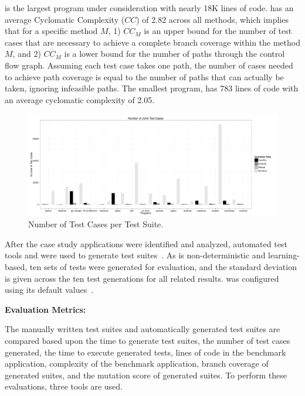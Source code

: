 \netweaver is the largest program under consideration with nearly 18K lines of code.  \netweaver has an average Cyclomatic Complexity ($CC$) of 2.82 across all methods, which implies that for a specific method $M$, 1) $CC_M$ is an upper bound for the number of test cases that are necessary to achieve a complete branch coverage within the method $M$, and 2) $CC_M$ is a lower bound for the number of paths through the control flow graph. Assuming each test case takes one path, the number of cases needed to achieve path coverage is equal to the number of paths that can actually be taken, ignoring infeasible paths.  The smallest program, \jni has 783 lines of code with an average cyclomatic complexity of 2.05.  

\begin{figure}[!t]
\centering
  \includegraphics[scale=0.4]{RGraphs/TestCasesGenerated.pdf}
    \caption{Number of Test Cases per Test Suite.}
  \label{fig:NumTests}
\end{figure}

After the case study applications were identified and analyzed, automated test tools \evo and \codepro were used to generate test suites~\cite{CodePro1, fraser:2011:eat:2025113.2025179}. As \evo is non-deterministic and learning-based, ten sets of tests were generated for evaluation, and the standard deviation is given across the ten test generations for all \evo related results.  \evo was configured using its default values~\cite{arcuri2013}.

\noindent \textbf{Evaluation Metrics:}

The manually written test suites and automatically generated test suites are compared based upon the time to generate test suites, the number of test cases generated, the time to execute generated tests, lines of code in the benchmark application, complexity of the benchmark application, branch coverage of generated suites, and the mutation score of generated suites. To perform these evaluations, three tools are used.


